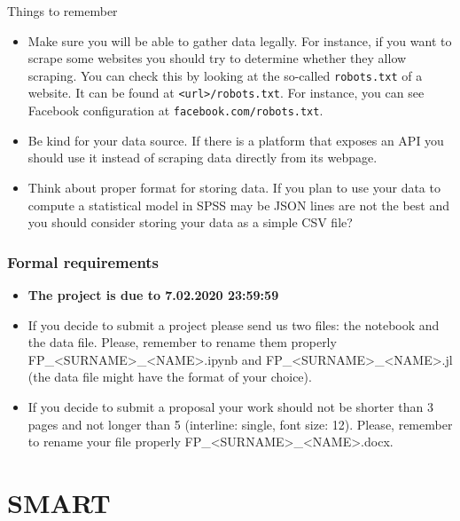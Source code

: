 \begin{frame}{Things to remember}
\begin{itemize}
 \item Make sure you will be able to gather data legally.
 For instance, if you want to scrape some websites you should try to determine whether they allow scraping. You can check this by
 looking at the so-called \texttt{robots.txt} of a website.
 It can be found at \texttt{<url>/robots.txt}. For instance,
 you can see Facebook configuration at \texttt{facebook.com/robots.txt}.
 \item Be kind for your data source. If there is a platform that exposes an API you should use it instead of scraping data directly from its webpage.
 \item Think about proper format for storing data. If you plan to use your data to compute a statistical model in SPSS may be JSON lines are not the best and you should consider storing your data as a simple CSV file?
\end{itemize}
\end{frame}

\begin{frame}
    \frametitle{Formal requirements}
    \begin{itemize}
        \item \textbf{The project is due to 7.02.2020 23:59:59}
        \item If you decide to submit a project please send us two files: the notebook and the data file. Please, remember to rename them properly FP\_<SURNAME>\_<NAME>.ipynb and FP\_<SURNAME>\_<NAME>.jl (the data file might have the format of your choice).
        \item If you decide to submit a proposal your work should not be shorter than 3 pages and not longer than 5 (interline: single, font size: 12). Please, remember to rename your file properly FP\_<SURNAME>\_<NAME>.docx.
    \end{itemize}
\end{frame}

\section{SMART}


